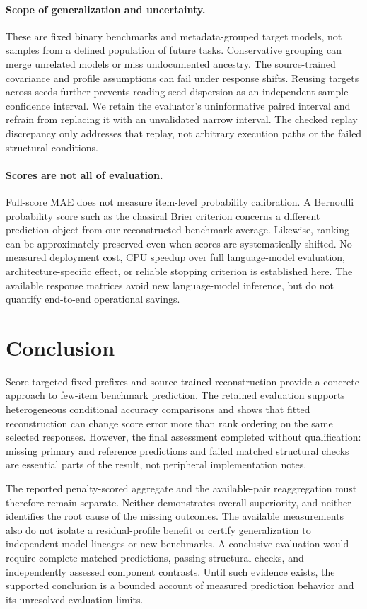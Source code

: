 \documentclass{article}
\begin{document}
\paragraph{Scope of generalization and uncertainty.}
These are fixed binary benchmarks and metadata-grouped target models, not samples from a defined population of future tasks. Conservative grouping can merge unrelated models or miss undocumented ancestry. The source-trained covariance and profile assumptions can fail under response shifts. Reusing targets across seeds further prevents reading seed dispersion as an independent-sample confidence interval. We retain the evaluator's uninformative paired interval and refrain from replacing it with an unvalidated narrow interval. The checked replay discrepancy only addresses that replay, not arbitrary execution paths or the failed structural conditions.

\paragraph{Scores are not all of evaluation.}
Full-score MAE does not measure item-level probability calibration. A Bernoulli probability score such as the classical Brier criterion \citep{Brier1950} concerns a different prediction object from our reconstructed benchmark average. Likewise, ranking can be approximately preserved even when scores are systematically shifted. No measured deployment cost, CPU speedup over full language-model evaluation, architecture-specific effect, or reliable stopping criterion is established here. The available response matrices avoid new language-model inference, but do not quantify end-to-end operational savings.

\section{Conclusion}
Score-targeted fixed prefixes and source-trained reconstruction provide a concrete approach to few-item benchmark prediction. The retained evaluation supports heterogeneous conditional accuracy comparisons and shows that fitted reconstruction can change score error more than rank ordering on the same selected responses. However, the final assessment completed without qualification: missing primary and reference predictions and failed matched structural checks are essential parts of the result, not peripheral implementation notes.

The reported penalty-scored aggregate and the available-pair reaggregation must therefore remain separate. Neither demonstrates overall superiority, and neither identifies the root cause of the missing outcomes. The available measurements also do not isolate a residual-profile benefit or certify generalization to independent model lineages or new benchmarks. A conclusive evaluation would require complete matched predictions, passing structural checks, and independently assessed component contrasts. Until such evidence exists, the supported conclusion is a bounded account of measured prediction behavior and its unresolved evaluation limits.
\end{document}

